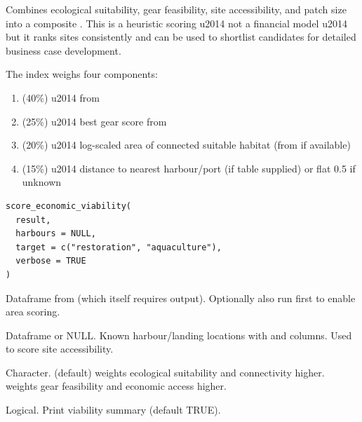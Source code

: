 \documentclass[a4paper]{book}
\begin{document}
%
\begin{Description}
Combines ecological suitability, gear feasibility, site accessibility, and
patch size into a composite  . This is a
heuristic scoring \bsl{}u2014 not a financial model \bsl{}u2014 but it ranks sites consistently
and can be used to shortlist candidates for detailed business case
development.

The index weighs four components:
\begin{enumerate}

\item{}  (40\%) \bsl{}u2014 from 
\item{}  (25\%) \bsl{}u2014 best gear score from 
\item{}  (20\%) \bsl{}u2014 log-scaled area of connected suitable
habitat (from  if available)
\item{}  (15\%) \bsl{}u2014 distance to nearest harbour/port (if
 table supplied) or flat 0.5 if unknown

\end{enumerate}

\end{Description}
%
\begin{Usage}
\begin{verbatim}
score_economic_viability(
  result,
  harbours = NULL,
  target = c("restoration", "aquaculture"),
  verbose = TRUE
)
\end{verbatim}
\end{Usage}
%
\begin{Arguments}
\begin{ldescription}
\item[\code{result}] Dataframe from  (which itself
requires  output). Optionally also run
 first to enable area scoring.

\item[\code{harbours}] Dataframe or NULL. Known harbour/landing locations with
 and  columns. Used to score site accessibility.

\item[\code{target}] Character.  (default) weights ecological
suitability and connectivity higher.  weights gear
feasibility and economic access higher.

\item[\code{verbose}] Logical. Print viability summary (default TRUE).
\end{ldescription}
\end{Arguments}
\end{document}

